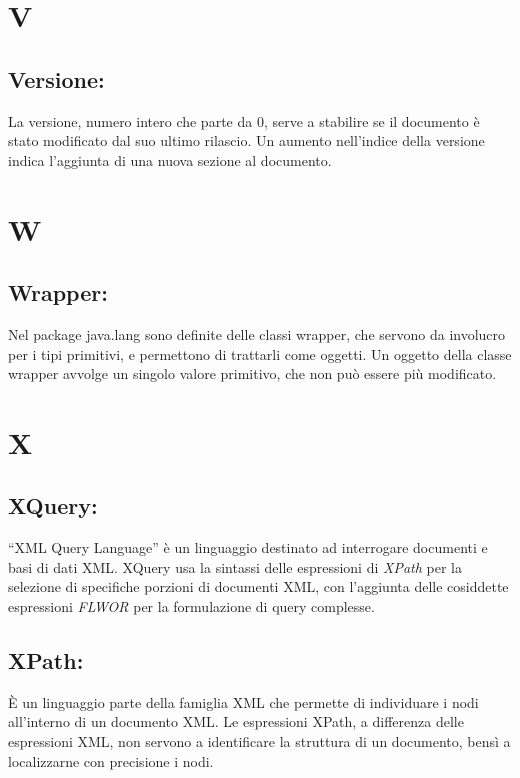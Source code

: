 \documentclass[11pt,titlepage,a4paper]{report}
\begin{document}
\chapter{V}
\section{Versione:}
La versione, numero intero che parte da 0, serve a stabilire se il documento \`e stato modificato dal suo ultimo rilascio. Un aumento nell'indice della versione indica l'aggiunta di una nuova sezione al documento.

\chapter{W}
\section{Wrapper:}
Nel package java.lang sono definite delle classi wrapper, che servono da involucro per i tipi primitivi, e permettono di trattarli come oggetti. Un oggetto della classe wrapper avvolge un singolo valore primitivo, che non pu\`o essere pi\`u modificato.

\chapter{X}
\section{XQuery:}
``XML Query Language'' \`e un linguaggio destinato ad interrogare documenti e basi di dati XML.
XQuery usa la sintassi delle espressioni di \textit{XPath} per la selezione di specifiche porzioni di documenti XML, con l'aggiunta delle cosiddette espressioni \textit{FLWOR} per la formulazione di query complesse.
\section{XPath:}
\`E un linguaggio parte della famiglia XML che permette di individuare i nodi all'interno di un documento XML. Le espressioni XPath, a differenza delle espressioni XML, non servono a identificare la struttura di un documento, bens\`i a localizzarne con precisione i nodi.
\end{document}
